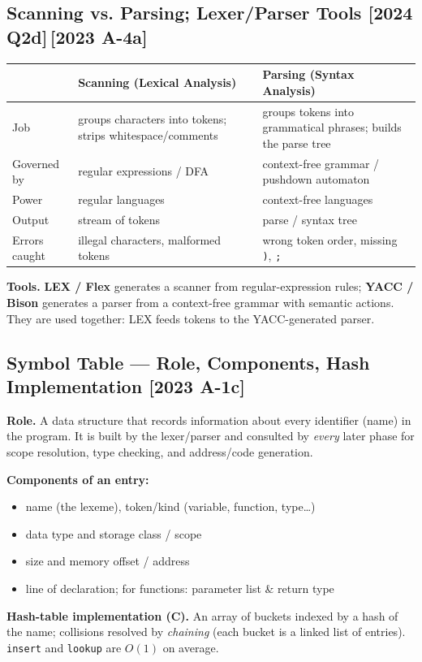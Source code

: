 \documentclass[12pt, a4paper]{article}
\newenvironment{qbox}{\begin{mdframed}[style=qframe]}{\end{mdframed}}
\newcommand{\yr}[1]{{\small\color{accent}\textbf{[#1]}}}
\newcommand{\term}[1]{\textbf{\color{keyblue}#1}}
\begin{document}
\subsection{Scanning vs. Parsing; Lexer/Parser Tools \yr{2024 Q2d}\,\yr{2023 A-4a}}
\begin{qbox}
\begin{tabularx}{\linewidth}{@{}l Y Y@{}}
\toprule
 & \textbf{Scanning (Lexical Analysis)} & \textbf{Parsing (Syntax Analysis)}\\
\midrule
Job & groups characters into tokens; strips whitespace/comments & groups tokens into grammatical phrases; builds the parse tree\\
Governed by & regular expressions / DFA & context-free grammar / pushdown automaton\\
Power & regular languages & context-free languages\\
Output & stream of tokens & parse / syntax tree\\
Errors caught & illegal characters, malformed tokens & wrong token order, missing \texttt{)}, \texttt{;}\\
\bottomrule
\end{tabularx}

\smallskip
\textbf{Tools.} \term{LEX / Flex} generates a scanner from regular-expression rules; \term{YACC / Bison}
generates a parser from a context-free grammar with semantic actions. They are used together: LEX feeds tokens to the YACC-generated parser.
\end{qbox}

\subsection{Symbol Table — Role, Components, Hash Implementation \yr{2023 A-1c}}
\begin{qbox}
\textbf{Role.} A data structure that records information about every identifier (name) in the program. It is built by
the lexer/parser and consulted by \emph{every} later phase for scope resolution, type checking, and address/code generation.

\textbf{Components of an entry:}
\begin{itemize}
\item name (the lexeme), token/kind (variable, function, type\dots)
\item data type and storage class / scope
\item size and memory offset / address
\item line of declaration; for functions: parameter list \& return type
\end{itemize}
\textbf{Hash-table implementation (C).} An array of buckets indexed by a hash of the name; collisions resolved by
\emph{chaining} (each bucket is a linked list of entries). \texttt{insert} and \texttt{lookup} are $O(1)$ on average.
\end{qbox}
\end{document}
